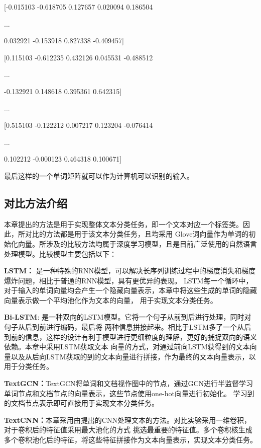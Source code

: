 \centerline{[-0.015103  -0.618705  0.127657  0.020094  0.186504 }

\centerline{...}

\centerline{0.032921  -0.153918  0.827338  -0.409457]}

\centerline{[0.115103  -0.612235  0.432126  0.045531  -0.488512 }

\centerline{...}

\centerline{-0.132921  0.148618  0.395361  0.642315]}

\centerline{...}

\centerline{[0.515103  -0.122212  0.007217  0.123204  -0.076414 }

\centerline{...}

\centerline{0.102212  -0.000123  0.464318  0.100671]}

最后这样的一个单词矩阵就可以作为计算机可以识别的输入。
\subsection{对比方法介绍}
本章提出的方法是用于实现整体文本分类任务，即一个文本对应一个标签类。因此，所对比的方法都是用于该文本分类任务，且均采用
Glove词向量作为单词的初始化向量。所涉及的比较方法均属于深度学习模型，且是目前广泛使用的自然语言处理模型。比较模型主要包括以下：

\textbf{LSTM：} 是一种特殊的RNN模型，可以解决长序列训练过程中的梯度消失和梯度爆炸问题，相比于普通的RNN模型，具有更优异的表现。
LSTM每一个循环中，对于输入的单词向量均会产生一个隐藏向量表示，本章中将这些生成的单词的隐藏向量表示做一个平均池化作为文本的向量，
用于实现文本分类任务。

\textbf{Bi-LSTM}: 是一种双向的LSTM模型。它将一个句子从前到后进行处理，同时对句子从后到前进行编码，最后将
两种信息拼接起来。相比于LSTM多了一个从后到前的信息，这样的设计有利于模型进行更细粒度的理解，更好的捕捉双向的语义依赖。本章中采用LSTM获取文本
向量的方式，对通过前向LSTM获得到的文本向量以及从后向LSTM获取的到的文本向量进行拼接，作为最终的文本向量表示，以用于分类任务。

\textbf{TextGCN：}TextGCN将单词和文档视作图中的节点，通过GCN进行半监督学习单词节点和文档节点的向量表示，这些节点使用one-hot向量进行初始化。
学习到的文档节点表示即可直接用于实现文本分类任务。

\textbf{TextCNN：}本章采用由提出的CNN处理文本的方法。对比实验采用一维卷积，对于卷积后的特征值采用最大池化的方式
挑选最重要的特征值。多个卷积核生成多个卷积池化后的特征，将这些特征拼接作为文本向量表示，实现文本分类任务。

